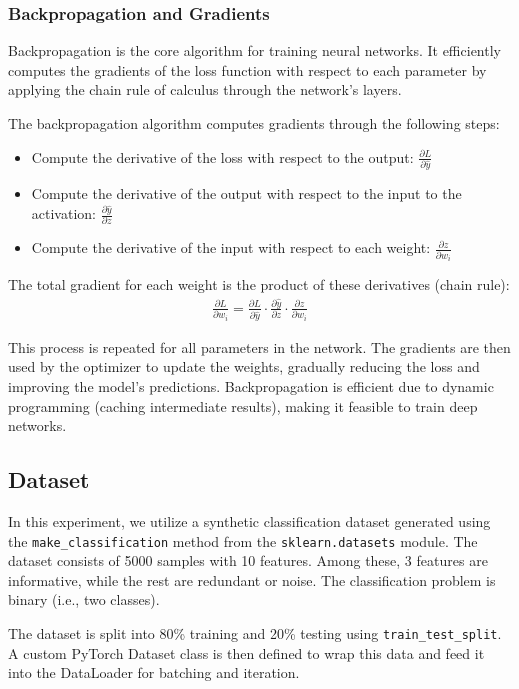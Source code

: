 \documentclass[a4paper, journal]{IEEEtran}
\begin{document}
\subsubsection{Backpropagation and Gradients}
Backpropagation is the core algorithm for training neural networks. It efficiently computes the gradients of the loss function with respect to each parameter by applying the chain rule of calculus through the network's layers.

The backpropagation algorithm computes gradients through the following steps:
\begin{itemize}
    \item Compute the derivative of the loss with respect to the output: $\frac{\partial L}{\partial \hat{y}}$
    \item Compute the derivative of the output with respect to the input to the activation: $\frac{\partial \hat{y}}{\partial z}$
    \item Compute the derivative of the input with respect to each weight: $\frac{\partial z}{\partial w_i}$
\end{itemize}
The total gradient for each weight is the product of these derivatives (chain rule):
\begin{align*}
    \frac{\partial L}{\partial w_i} = \frac{\partial L}{\partial \hat{y}} \cdot \frac{\partial \hat{y}}{\partial z} \cdot \frac{\partial z}{\partial w_i}
\end{align*}

This process is repeated for all parameters in the network. The gradients are then used by the optimizer to update the weights, gradually reducing the loss and improving the model's predictions. Backpropagation is efficient due to dynamic programming (caching intermediate results), making it feasible to train deep networks.

\subsection{Dataset}
In this experiment, we utilize a synthetic classification dataset generated using the \texttt{make\_classification} method from the \texttt{sklearn.datasets} module. The dataset consists of 5000 samples with 10 features. Among these, 3 features are informative, while the rest are redundant or noise. The classification problem is binary (i.e., two classes).

The dataset is split into 80\% training and 20\% testing using \texttt{train\_test\_split}. A custom PyTorch Dataset class is then defined to wrap this data and feed it into the DataLoader for batching and iteration.
\end{document}
